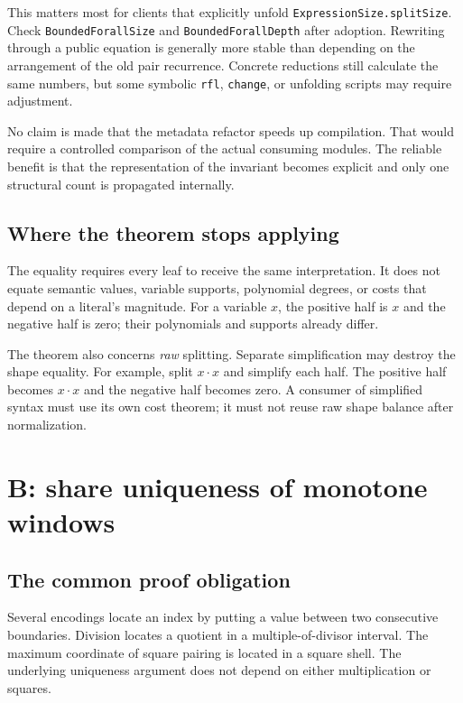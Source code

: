 \documentclass[11pt,letterpaper]{article}
\newcommand{\code}[1]{\texttt{\small #1}}
\begin{document}
This matters most for clients that explicitly unfold \code{ExpressionSize.splitSize}. Check \code{BoundedForallSize} and \code{BoundedForallDepth} after adoption. Rewriting through a public equation is generally more stable than depending on the arrangement of the old pair recurrence. Concrete reductions still calculate the same numbers, but some symbolic \code{rfl}, \code{change}, or unfolding scripts may require adjustment.

No claim is made that the metadata refactor speeds up compilation. That would require a controlled comparison of the actual consuming modules. The reliable benefit is that the representation of the invariant becomes explicit and only one structural count is propagated internally.

\subsection{Where the theorem stops applying}

The equality requires every leaf to receive the same interpretation. It does not equate semantic values, variable supports, polynomial degrees, or costs that depend on a literal's magnitude. For a variable $x$, the positive half is $x$ and the negative half is zero; their polynomials and supports already differ.

The theorem also concerns \emph{raw} splitting. Separate simplification may destroy the shape equality. For example, split $x\cdot x$ and simplify each half. The positive half becomes $x\cdot x$ and the negative half becomes zero. A consumer of simplified syntax must use its own cost theorem; it must not reuse raw shape balance after normalization.

\section{B: share uniqueness of monotone windows}

\subsection{The common proof obligation}

Several encodings locate an index by putting a value between two consecutive boundaries. Division locates a quotient in a multiple-of-divisor interval. The maximum coordinate of square pairing is located in a square shell. The underlying uniqueness argument does not depend on either multiplication or squares.
\end{document}

